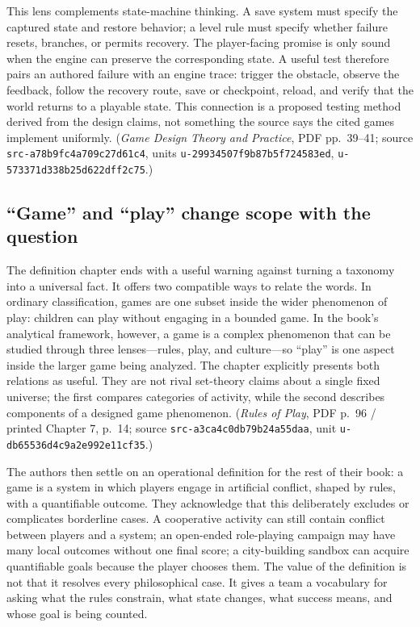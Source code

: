This lens complements state-machine thinking. A save system must specify the captured state and restore behavior; a level rule must specify whether failure resets, branches, or permits recovery. The player-facing promise is only sound when the engine can preserve the corresponding state. A useful test therefore pairs an authored failure with an engine trace: trigger the obstacle, observe the feedback, follow the recovery route, save or checkpoint, reload, and verify that the world returns to a playable state. This connection is a proposed testing method derived from the design claims, not something the source says the cited games implement uniformly. (\emph{Game Design Theory and Practice}, PDF pp.~39--41; source \texttt{src-a78b9fc4a709c27d61c4}, units \texttt{u-29934507f9b87b5f724583ed}, \texttt{u-573371d338b25d622dff2c75}.)

\subsection{``Game'' and ``play'' change scope with the question}\label{game-and-play-change-scope-with-the-question}

The definition chapter ends with a useful warning against turning a taxonomy into a universal fact. It offers two compatible ways to relate the words. In ordinary classification, games are one subset inside the wider phenomenon of play: children can play without engaging in a bounded game. In the book's analytical framework, however, a game is a complex phenomenon that can be studied through three lenses---rules, play, and culture---so ``play'' is one aspect inside the larger game being analyzed. The chapter explicitly presents both relations as useful. They are not rival set-theory claims about a single fixed universe; the first compares categories of activity, while the second describes components of a designed game phenomenon. (\emph{Rules of Play}, PDF p.~96 / printed Chapter 7, p.~14; source \texttt{src-a3ca4c0db79b24a55daa}, unit \texttt{u-db65536d4c9a2e992e11cf35}.)

The authors then settle on an operational definition for the rest of their book: a game is a system in which players engage in artificial conflict, shaped by rules, with a quantifiable outcome. They acknowledge that this deliberately excludes or complicates borderline cases. A cooperative activity can still contain conflict between players and a system; an open-ended role-playing campaign may have many local outcomes without one final score; a city-building sandbox can acquire quantifiable goals because the player chooses them. The value of the definition is not that it resolves every philosophical case. It gives a team a vocabulary for asking what the rules constrain, what state changes, what success means, and whose goal is being counted.

